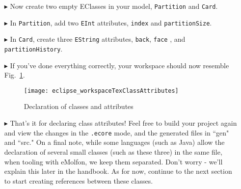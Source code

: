 \begin{itemize}
\item[$\blacktriangleright$] Now create two empty EClasses in your model, \texttt{Partition} and \texttt{Card}.

\item[$\blacktriangleright$] In \texttt{Partition}, add two \texttt{EInt} attributes, \texttt{index} and \texttt{partitionSize}.

\item[$\blacktriangleright$] In \texttt{Card}, create three \texttt{EString} attributes, \texttt{back}, \texttt{face} , and \texttt{partitionHistory}.

\item[$\blacktriangleright$] If you've done everything correctly, your workspace should now resemble Fig.~\ref{fig:workspaceClassAttributes}.

\vspace{0.5cm}

\begin{figure}[htbp]
	\centering
  \texttt{[image: eclipse\_workspaceTexClassAttributes]}
	\caption{Declaration of classes and attributes}
	\label{fig:workspaceClassAttributes}
\end{figure} 

\vspace{0.5cm}

\item[$\blacktriangleright$] That's it for declaring class attributes! Feel free to build your project again and view the changes in the \texttt{.ecore}
mode, and the generated files in ``gen" and ``src." On a final note, while some languages (such as Java) allow the declaration of several small classes (such as
these three) in the same file, when tooling with eMolfon, we keep them separated. Don't worry - we'll explain this later in the handbook. As for now, continue
to the next section to start creating references between these classes.


\end{itemize}
